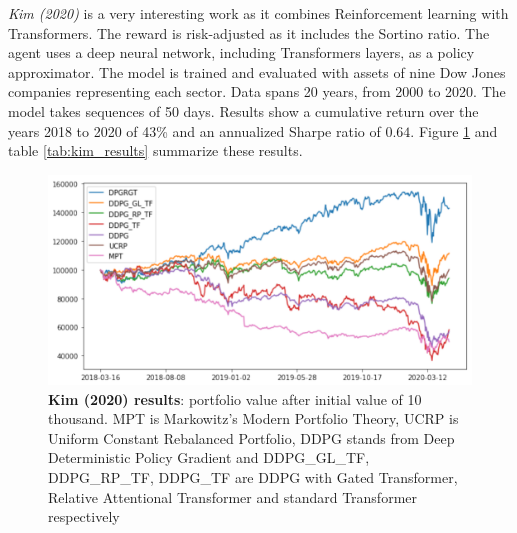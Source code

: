 \hfill \break

\textit{Kim (2020) } \cite{kim2020portfolio} is a very interesting work as it combines Reinforcement learning with Transformers. The reward is risk-adjusted as it includes the Sortino ratio. The agent uses a deep neural network, including Transformers layers, as a policy approximator. The model is trained and evaluated with assets of nine Dow Jones companies representing each sector. Data spans 20 years, from 2000 to 2020. The model takes sequences of 50 days. Results show a cumulative return over the years 2018 to 2020 of 43\% and an annualized Sharpe ratio of $0.64$.
Figure \ref{kim_results} and table \ref{tab:kim_results} summarize these results.

\begin{figure}[h]
\includegraphics[width=12cm]{cap1/kim_results.png}
\caption[Kim (2020) results]{
\textbf{Kim (2020) results}: portfolio value after initial value of 10 thousand. MPT  is Markowitz’s Modern Portfolio Theory, UCRP is Uniform Constant Rebalanced Portfolio, DDPG stands from Deep Deterministic Policy Gradient and DDPG\_GL\_TF, DDPG\_RP\_TF, DDPG\_TF are DDPG  with Gated Transformer, Relative Attentional Transformer and standard Transformer respectively}
\label{kim_results}
\end{figure}

